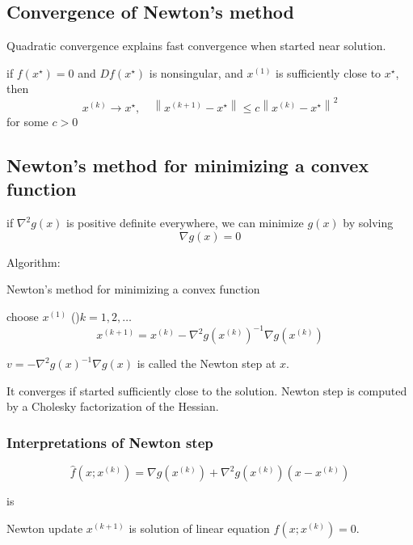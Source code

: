 \subsection{Convergence of Newton’s method}

Quadratic convergence explains fast convergence when started near solution.

\begin{theorem}
    if $ f\left(x^{\star}\right)=0 $ and $ D f\left(x^{\star}\right) $ is nonsingular, and $ x^{(1)} $ is sufficiently close to $ x^{\star} $, then
$$
x^{(k)} \rightarrow x^{\star}, \quad\left\|x^{(k+1)}-x^{\star}\right\| \leq c\left\|x^{(k)}-x^{\star}\right\|^{2}
$$
for some $ c>0 $
\end{theorem}

\subsection{Newton’s method for minimizing a convex function}

if $ \nabla^{2} g(x) $ is positive definite everywhere, we can minimize $ g(x) $ by solving
$$
\nabla g(x)=0
$$


Algorithm:
\begin{algorithm}[htbp]
    \caption{Newton’s method for minimizing a convex function}
    choose $ x^{(1)} $\;
    \While(){$ k=1,2, \ldots $}{
        $$
x^{(k+1)}=x^{(k)}-\nabla^{2} g\left(x^{(k)}\right)^{-1} \nabla g\left(x^{(k)}\right)
$$\;
    }
\end{algorithm}

$ v=-\nabla^{2} g(x)^{-1} \nabla g(x) $ is called the Newton step at $ x $.

It converges if started sufficiently close to the solution. Newton step is computed by a Cholesky factorization of the Hessian.

\subsubsection{Interpretations of Newton step}


\begin{definition}[affine approximation of $ f(x)=\nabla g(x) $ around $ x^{(k)} $]
    $$
\hat{f}\left(x ; x^{(k)}\right)=\nabla g\left(x^{(k)}\right)+\nabla^{2} g\left(x^{(k)}\right)\left(x-x^{(k)}\right)
$$
\end{definition} is

Newton update $ x^{(k+1)} $ is solution of linear equation $ \hat{f}\left(x ; x^{(k)}\right)=0 $.

